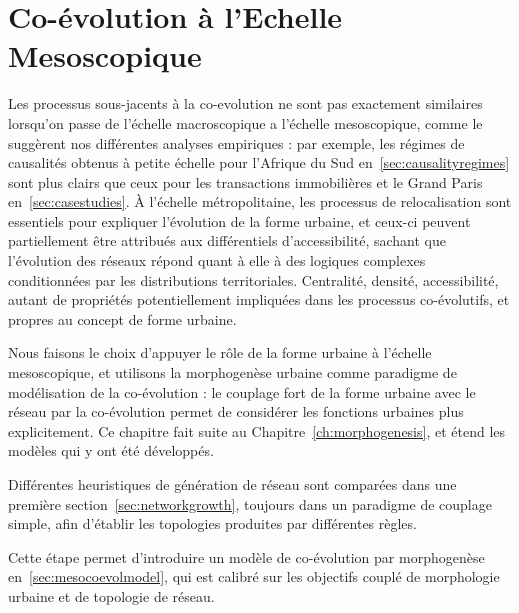 

\chapter{Co-évolution à l'Echelle Mesoscopique}


\label{ch:mesocoevolution} 




Les processus sous-jacents à la co-evolution ne sont pas exactement similaires lorsqu'on passe de l'échelle macroscopique a l'échelle mesoscopique, comme le suggèrent nos différentes analyses empiriques : par exemple, les régimes de causalités obtenus à petite échelle pour l'Afrique du Sud en~\ref{sec:causalityregimes} sont plus clairs que ceux pour les transactions immobilières et le Grand Paris en~\ref{sec:casestudies}. À l'échelle métropolitaine, les processus de relocalisation sont essentiels pour expliquer l'évolution de la forme urbaine, et ceux-ci peuvent partiellement être attribués aux différentiels d'accessibilité, sachant que l'évolution des réseaux répond quant à elle à des logiques complexes conditionnées par les distributions territoriales. Centralité, densité, accessibilité, autant de propriétés potentiellement impliquées dans les processus co-évolutifs, et propres au concept de forme urbaine.


Nous faisons le choix d'appuyer le rôle de la forme urbaine à l'échelle mesoscopique, et utilisons la morphogenèse urbaine comme paradigme de modélisation de la co-évolution : le couplage fort de la forme urbaine avec le réseau par la co-évolution permet de considérer les fonctions urbaines plus explicitement. Ce chapitre fait suite au Chapitre~\ref{ch:morphogenesis}, et étend les modèles qui y ont été développés.

Différentes heuristiques de génération de réseau sont comparées dans une première section~\ref{sec:networkgrowth}, toujours dans un paradigme de couplage simple, afin d'établir les topologies produites par différentes règles.

Cette étape permet d'introduire un modèle de co-évolution par morphogenèse en~\ref{sec:mesocoevolmodel}, qui est calibré sur les objectifs couplé de morphologie urbaine et de topologie de réseau.

